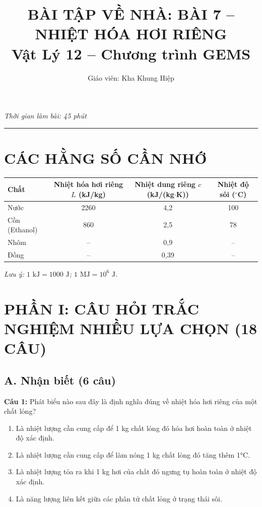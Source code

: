 \documentclass[12pt,a4paper]{article}
\title{\textbf{BÀI TẬP VỀ NHÀ: BÀI 7 -- NHIỆT HÓA HƠI RIÊNG}\\
\large Vật Lý 12 -- Chương trình GEMS}
\author{Giáo viên: Kha Khung Hiệp}
\date{}
\begin{document}
\maketitle
\textit{Thời gian làm bài: 45 phút}

\vspace{1em}
\hrule
\vspace{1em}

\section*{CÁC HẰNG SỐ CẦN NHỚ}
\begin{center}
\begin{tabular}{lccc}
\toprule
\textbf{Chất} & \textbf{Nhiệt hóa hơi riêng $L$ (kJ/kg)} & \textbf{Nhiệt dung riêng $c$ (kJ/(kg$\cdot$K))} & \textbf{Nhiệt độ sôi ($^{\circ}$C)} \\
\midrule
Nước & 2260 & 4,2 & 100 \\
Cồn (Ethanol) & 860 & 2,5 & 78 \\
Nhôm & -- & 0,9 & -- \\
Đồng & -- & 0,39 & -- \\
\bottomrule
\end{tabular}
\end{center}
\textit{Lưu ý: $1\text{ kJ} = 1000\text{ J}$; $1\text{ MJ} = 10^6\text{ J}$.}

\section*{PHẦN I: CÂU HỎI TRẮC NGHIỆM NHIỀU LỰA CHỌN (18 CÂU)}

\subsection*{A. Nhận biết (6 câu)}

\textbf{Câu 1:} Phát biểu nào sau đây là định nghĩa đúng về nhiệt hóa hơi riêng của một chất lỏng?
\begin{enumerate}[label=\Alph*.]
  \item Là nhiệt lượng cần cung cấp để 1 kg chất lỏng đó hóa hơi hoàn toàn ở nhiệt độ xác định.
  \item Là nhiệt lượng cần cung cấp để làm nóng 1 kg chất lỏng đó tăng thêm 1°C.
  \item Là nhiệt lượng tỏa ra khi 1 kg hơi của chất đó ngưng tụ hoàn toàn ở nhiệt độ xác định.
  \item Là năng lượng liên kết giữa các phân tử chất lỏng ở trạng thái sôi.
\end{enumerate}
\end{document}
